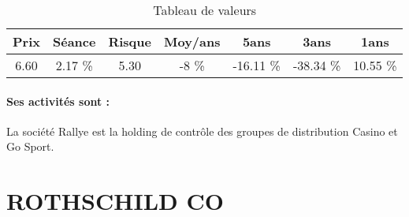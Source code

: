 \documentclass[11pt,a4paper]{report}%
\begin{document}
\begin{table}[H]
  \centering
    \begin{tabular}{|c|c|c|c|c|c|c|}
    \hline
    Prix & Séance & Risque  & Moy/ans & 5ans & 3ans & 1ans \\
    \hline
    6.60 &    2.17 \%    & 5.30 & -8 \% & -16.11 \% & -38.34 \% & 10.55 \% \\
    \hline
    \end{tabular}%
        \label{tab:table_RALLYE}%
      \caption{Tableau de valeurs}
\end{table}%

\paragraph{Ses activités sont : } La société Rallye est la holding de contrôle des groupes de distribution Casino et Go Sport. 
    
    \newpage

\section{ROTHSCHILD CO}
\end{document}
